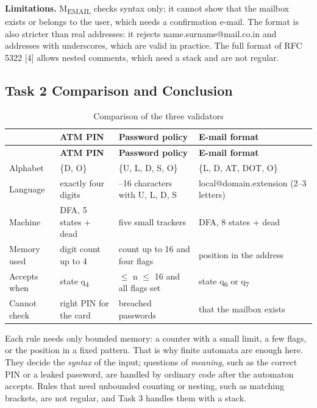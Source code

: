 \documentclass[12pt,a4paper]{article}
\begin{document}
\textbf{Limitations.} M\textsubscript{EMAIL} checks syntax only; it cannot show that the mailbox exists or belongs to the user, which needs a confirmation e-mail. The format is also stricter than real addresses: it rejects name.surname@mail.co.in and addresses with underscores, which are valid in practice. The full format of RFC 5322 [4] allows nested comments, which need a stack and are not regular.

\subsection{Task 2 Comparison and Conclusion}

{\footnotesize
\begin{longtable}{|>{\raggedright\arraybackslash}p{}|>{\raggedright\arraybackslash}p{}|>{\raggedright\arraybackslash}p{}|>{\raggedright\arraybackslash}p{}|}
\caption[Comparison of the three validators]{Comparison of the three validators}\label{tab:t2_compare}\\
\hline
\rowcolor{hdr} & \textbf{ATM PIN} & \textbf{Password policy} & \textbf{E-mail format}\\ \hline
\endfirsthead
\hline
\rowcolor{hdr} & \textbf{ATM PIN} & \textbf{Password policy} & \textbf{E-mail format}\\ \hline
\endhead
Alphabet & \{D, O\} & \{U, L, D, S, O\} & \{L, D, AT, DOT, O\}\\ \hline
Language & exactly four digits & 8--16 characters with U, L, D, S & local@domain.extension (2--3 letters)\\ \hline
Machine & DFA, 5 states + dead & five small trackers & DFA, 8 states + dead\\ \hline
Memory used & digit count up to 4 & count up to 16 and four flags & position in the address\\ \hline
Accepts when & state q\textsubscript{4} & 8 \ensuremath{\leq} n \ensuremath{\leq} 16 and all flags set & state q\textsubscript{6} or q\textsubscript{7}\\ \hline
Cannot check & right PIN for the card & breached passwords & that the mailbox exists\\ \hline
\end{longtable}}

Each rule needs only bounded memory: a counter with a small limit, a few flags, or the position in a fixed pattern. That is why finite automata are enough here. They decide the \textit{syntax} of the input; questions of \textit{meaning}, such as the correct PIN or a leaked password, are handled by ordinary code after the automaton accepts. Rules that need unbounded counting or nesting, such as matching brackets, are not regular, and Task 3 handles them with a stack.
\end{document}
